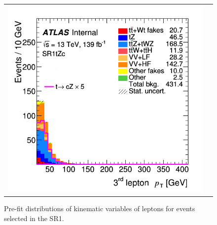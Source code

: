 \begin{figure}[!htbp]
\begin{tabular}{cc}
		\includegraphics[width=.35\textwidth]{Appendices/AP6/figures/SR1/lep3_pt} \\
	\end{tabular}
	\caption{Pre-fit distributions of kinematic variables of leptons for events selected in the SR1\tZc.
		\ErrStatOnly
		\Blinded
	}%
	\label{fig:sel:sr1:leps}
\end{figure}

